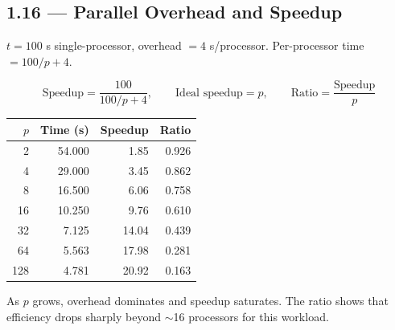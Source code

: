 \subsection*{1.16 --- Parallel Overhead and Speedup}
\hypertarget{sol-1.16}{}

$t = 100$ s single-processor, overhead $= 4$ s/processor.
Per-processor time $= 100/p + 4$.

\[
  \text{Speedup} = \frac{100}{100/p + 4}, \qquad
  \text{Ideal speedup} = p, \qquad
  \text{Ratio} = \frac{\text{Speedup}}{p}
\]

\begin{center}
\begin{tabular}{rrrr}
\toprule
$p$ & Time (s) & Speedup & Ratio \\
\midrule
2   & 54.000 & 1.85  & 0.926 \\
4   & 29.000 & 3.45  & 0.862 \\
8   & 16.500 & 6.06  & 0.758 \\
16  & 10.250 & 9.76  & 0.610 \\
32  & 7.125  & 14.04 & 0.439 \\
64  & 5.563  & 17.98 & 0.281 \\
128 & 4.781  & 20.92 & 0.163 \\
\bottomrule
\end{tabular}
\end{center}

As $p$ grows, overhead dominates and speedup saturates.
The ratio shows that efficiency drops sharply beyond $\sim$16 processors
for this workload.
